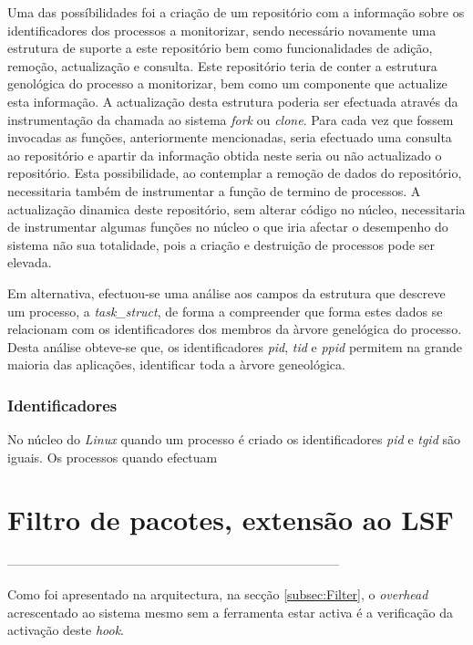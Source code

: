 Uma das possíbilidades foi a criação de um repositório com a informação sobre os identificadores dos processos a monitorizar, sendo necessário novamente uma estrutura de suporte a este repositório bem como funcionalidades de adição, remoção, actualização e consulta.
Este repositório teria de conter a estrutura genológica do processo a monitorizar, bem como um componente que actualize esta informação.
A actualização desta estrutura poderia ser efectuada através da instrumentação da chamada ao sistema \textit{fork} ou \textit{clone}.
Para cada vez que fossem invocadas as funções, anteriormente mencionadas, seria efectuado uma consulta ao repositório e apartir da informação obtida neste seria ou não actualizado o repositório.
Esta possibilidade, ao contemplar a remoção de dados do repositório, necessitaria também de instrumentar a função de termino de processos.
A actualização dinamica deste repositório, sem alterar código no núcleo, necessitaria de instrumentar algumas funções no núcleo o que iria afectar o desempenho do sistema não sua totalidade, pois a criação e destruição de processos pode ser elevada.

Em alternativa, efectuou-se uma análise aos campos da estrutura que descreve um processo, a \textit{task\_struct}, de forma a compreender que forma estes dados se relacionam com os identificadores dos membros da àrvore genelógica do processo.
Desta análise obteve-se que, os identificadores \textit{pid}, \textit{tid} e \textit{ppid} permitem na grande maioria das aplicações, identificar toda a àrvore geneológica.


\subsubsection{Identificadores}

No núcleo do \textit{Linux} quando um processo é criado os identificadores \textit{pid} e \textit{tgid} são iguais.
Os processos quando efectuam



\section{Filtro de pacotes, extensão ao LSF}
------------------------------------------------------------------------------

Como foi apresentado na arquitectura, na secção \ref{subsec:Filter}, o \textit{overhead} acrescentado ao sistema mesmo sem a ferramenta estar activa é
a verificação da activação deste \textit{hook}.

